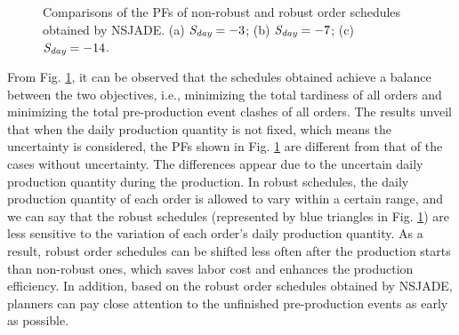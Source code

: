 \documentclass[journal]{IEEEtran}
\theoremstyle{definition}
\begin{document}
\begin{figure}
\centering
{}
\caption{Comparisons of the PFs of non-robust and robust order schedules obtained by NSJADE. (a) $\emph{S}_\emph{day}=-3$; (b) $\emph{S}_\emph{day}=-7$; (c) $\emph{S}_\emph{day}=-14$.} \label{figH}
\end{figure}

From Fig. \ref{figH}, it can be observed that the schedules obtained achieve a balance between the two objectives, i.e., minimizing the total tardiness of all orders and minimizing the total pre-production event clashes of all orders.
The results unveil that when the daily production quantity is not fixed, which means the uncertainty is considered, the PFs shown in Fig. \ref{figH} are different from that of the cases without uncertainty. The differences appear due to the uncertain daily production quantity during the production.
In robust schedules, the daily production quantity of each order is allowed to vary within a certain range, and we can say that the robust schedules (represented by blue triangles in Fig. \ref{figH}) are less sensitive to the variation of each order's daily production quantity. As a result, robust order schedules can be shifted less often after the production starts than non-robust ones, which saves labor cost and enhances the production efficiency. In addition, based on the robust order schedules obtained by NSJADE, planners can pay close attention to the unfinished pre-production events as early as possible.
\end{document}
